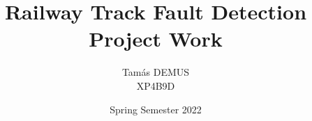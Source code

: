 \documentclass{article}
\title{Railway Track Fault Detection\\\large Project Work\\}
\author{Tamás DEMUS\\XP4B9D}
\date{Spring Semester 2022}
\begin{document}


\pagebreak
\tableofcontents
\pagebreak



\pagebreak
\listoffigures
\pagebreak
\listoftables
\pagebreak
\printbibliography
\end{document}
